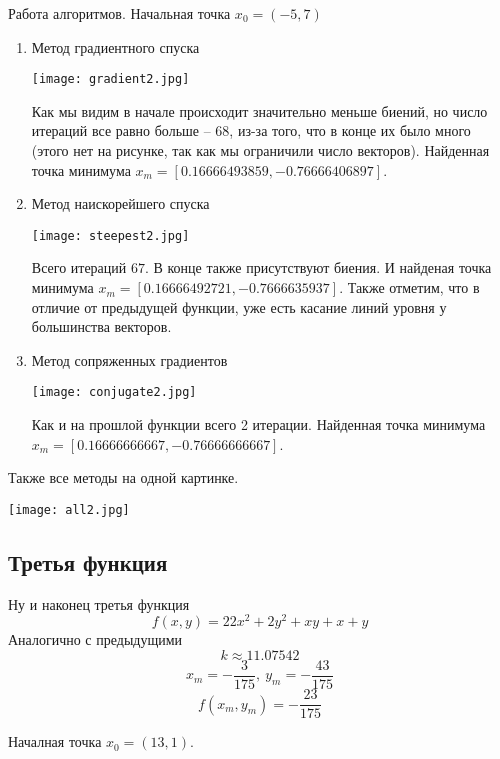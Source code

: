 Работа алгоритмов. Начальная точка $x_0 = (-5, 7)$
\newpage
\begin{enumerate}
    \item Метод градиентного спуска
    
    \texttt{[image: gradient2.jpg]}

    Как мы видим в начале происходит значительно меньше биений, но число
    итераций все равно больше -- 68, из-за того, что в конце их было много
    (этого нет на рисунке, так как мы ограничили число векторов).
    Найденная точка минимума $x_m = [0.16666493859, -0.76666406897]$.



    \item Метод наискорейшего спуска

    \texttt{[image: steepest2.jpg]}

    Всего итераций $67$. В конце также присутствуют биения. 
    И найденая точка минимума \newline $x_m = [0.16666492721, -0.7666635937]$.
    Также отметим, что в отличие от предыдущей функции, уже есть касание линий уровня у большинства векторов.
    \newpage
    \item Метод сопряженных градиентов
    
    \texttt{[image: conjugate2.jpg]}

    Как и на прошлой функции всего 2 итерации. Найденная точка минимума $x_m = [0.16666666667, -0.76666666667]$.

\end{enumerate}

Также все методы на одной картинке.

\texttt{[image: all2.jpg]}

\subsection{Третья функция}
Ну и наконец третья функция $$f(x, y) = 22x^2 + 2y^2 + xy + x + y$$
Аналогично с предыдущими
$$k \approx 11.07542$$
$$x_m = -\frac{3}{175},\ y_m = -\frac{43}{175}$$
$$f(x_m, y_m) = -\frac{23}{175}$$

Началная точка $x_0 = (13, 1)$.


